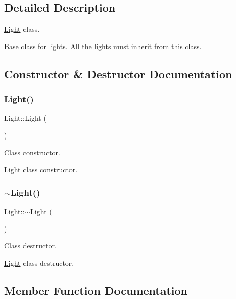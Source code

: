 \subsection{Detailed Description}
\hyperlink{class_light}{Light} class. 

Base class for lights. All the lights must inherit from this class. 

\subsection{Constructor \& Destructor Documentation}
\mbox{\label{class_light_aeb5df09a25a32f19fdffa761268ba24f}} 
\subsubsection{\texorpdfstring{Light()}{Light()}}
{\footnotesize\ttfamily Light\+::\+Light (\begin{DoxyParamCaption}{ }\end{DoxyParamCaption})}



Class constructor. 

\hyperlink{class_light}{Light} class constructor. \mbox{\label{class_light_ad0e59fad13bb6cfadc25b2c477e9ddc7}} 
\subsubsection{\texorpdfstring{$\sim$\+Light()}{~Light()}}
{\footnotesize\ttfamily Light\+::$\sim$\+Light (\begin{DoxyParamCaption}{ }\end{DoxyParamCaption})}



Class destructor. 

\hyperlink{class_light}{Light} class destructor. 

\subsection{Member Function Documentation}
\mbox{\label{class_light_ac017022a6e8dd3a29de1e024cfde9d9b}} 
